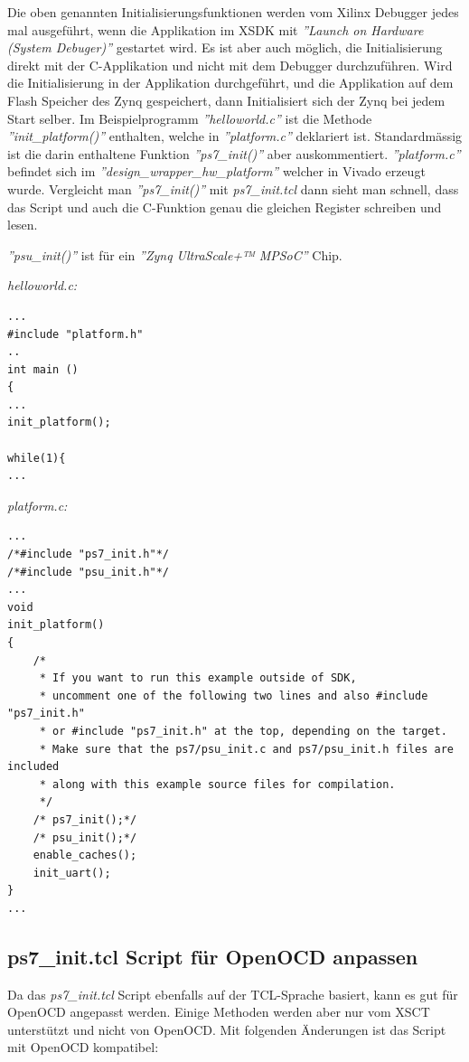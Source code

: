 Die oben genannten Initialisierungsfunktionen werden vom Xilinx Debugger jedes mal ausgeführt, wenn die Applikation im XSDK mit \textit{''Launch on Hardware (System Debuger)''} gestartet wird.
Es ist aber auch möglich, die Initialisierung direkt mit der C-Applikation und nicht mit dem Debugger durchzuführen.
Wird die Initialisierung in der Applikation durchgeführt, und die Applikation auf dem Flash Speicher des Zynq gespeichert, dann Initialisiert sich der Zynq bei jedem Start selber.
Im Beispielprogramm \textit{''helloworld.c''} ist die Methode \textit{''init\_platform()''} enthalten, welche in \textit{''platform.c''} deklariert ist.
Standardmässig ist die darin enthaltene Funktion \textit{''ps7\_init()''} aber auskommentiert.
\textit{''platform.c''} befindet sich im \textit{''design\_wrapper\_hw\_platform''} welcher in Vivado erzeugt wurde.
Vergleicht man \textit{''ps7\_init()''} mit \textit{ps7\_init.tcl}  dann sieht man schnell, dass das Script und auch die C-Funktion genau die gleichen Register schreiben und lesen.

\textit{''psu\_init()''} ist für ein \textit{''Zynq UltraScale+™ MPSoC''} Chip.


\textit{helloworld.c:}
\lstset{language=c}
\begin{lstlisting}[frame=single]
...
#include "platform.h"
..
int main ()
{
...
init_platform();

while(1){
...
\end{lstlisting}



\textit{platform.c:}
\lstset{language=c}
\begin{lstlisting}[frame=single]
...
/*#include "ps7_init.h"*/
/*#include "psu_init.h"*/
...
void
init_platform()
{
    /*
     * If you want to run this example outside of SDK,
     * uncomment one of the following two lines and also #include "ps7_init.h"
     * or #include "ps7_init.h" at the top, depending on the target.
     * Make sure that the ps7/psu_init.c and ps7/psu_init.h files are included
     * along with this example source files for compilation.
     */
    /* ps7_init();*/
    /* psu_init();*/
    enable_caches();
    init_uart();
}
...

\end{lstlisting}




\subsection{ps7\_init.tcl Script für OpenOCD anpassen}
Da das \textit{ps7\_init.tcl} Script ebenfalls auf der TCL-Sprache basiert, kann es gut für OpenOCD angepasst werden.
Einige Methoden werden aber nur vom XSCT unterstützt und nicht von OpenOCD.
Mit folgenden Änderungen ist das Script mit OpenOCD kompatibel:

